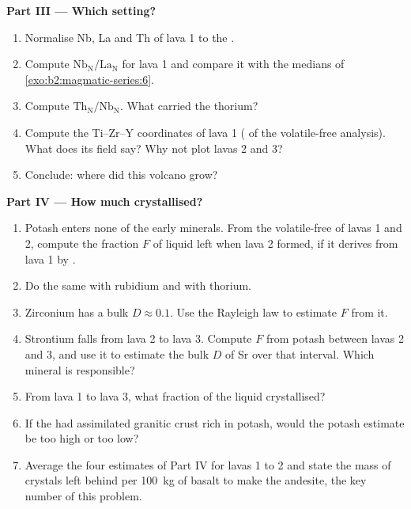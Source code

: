 \begin{problem}
\noindent\textbf{Part III --- Which setting?}
\begin{enumerate}[resume]
\item Normalise Nb, La and Th of lava 1 to the .
\item Compute $\mathrm{Nb_N}/\mathrm{La_N}$ for lava 1 and compare it with the medians
of \cref{exo:b2:magmatic-series:6}.
\item Compute $\mathrm{Th_N}/\mathrm{Nb_N}$. What carried the thorium?
\item Compute the Ti--Zr--Y coordinates of lava 1 ( of the volatile-free
analysis). What does its field say? Why not plot lavas 2 and 3?
\item Conclude: where did this volcano grow?
\end{enumerate}

\noindent\textbf{Part IV --- How much crystallised?}
\begin{enumerate}[resume]
\item Potash enters none of the early minerals. From the volatile-free  of
lavas 1 and 2, compute the fraction $F$ of liquid left when lava 2 formed, if it
derives from lava 1 by .
\item Do the same with rubidium and with thorium.
\item Zirconium has a bulk $D \approx 0.1$. Use the Rayleigh law to estimate $F$ from
it.
\item Strontium falls from lava 2 to lava 3. Compute $F$ from potash between lavas 2 and
3, and use it to estimate the bulk $D$ of Sr over that interval. Which mineral is
responsible?
\item From lava 1 to lava 3, what fraction of the liquid crystallised?
\item If the  had assimilated granitic crust rich in potash, would the potash
estimate be too high or too low?
\item Average the four estimates of Part IV for lavas 1 to 2 and state the mass of
crystals left behind per \qty{100}{kg} of basalt to make the andesite, the key number
of this problem.
\end{enumerate}
\end{problem}
